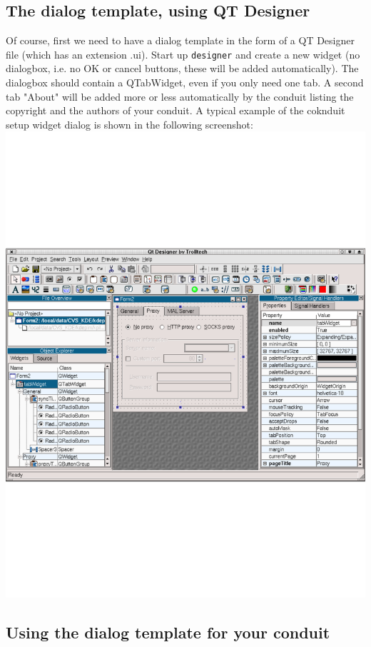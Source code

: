 \documentclass[10pt,a4paper]{article}
\newcommand{\file}[1]{{\small\texttt{#1}}}
\begin{document}
\subsection{The dialog template, using QT Designer}
Of course, first we need to have a dialog template in the form of a QT 
Designer file (which has an extension .ui). Start up \file{designer} and 
create a new widget (no dialogbox, i.e. no OK or cancel buttons, these will be added automatically). The dialogbox should contain a QTabWidget, even if you only need one tab. A second tab "About" will be added more or less automatically by the conduit listing the copyright and the authors of your conduit. A typical example of the coknduit setup widget dialog is shown in the following screenshot:
\includegraphics[width=14cm]{pictures/ProxyTab}


\subsection{Using the dialog template for your conduit}
\end{document}
